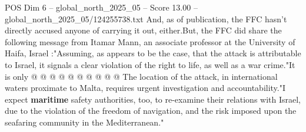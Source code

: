 \begin{textsample}{POS Dim 6 – global\_north\_2025\_05 – Score 13.00 – global\_north\_2025\_05/124255738.txt}
And, as of publication, the FFC hasn't directly accused anyone of carrying it out, either.But, the FFC did share the following message from Itamar Mann, an associate professor at the University of Haifa, Israel :"Assuming, as appears to be the case, that the attack is attributable to Israel, it signals a clear violation of the right to life, as well as a war crime."It is only @ @ @ @ @ @ @ @ @ @ The location of the attack, in international waters proximate to Malta, requires urgent investigation and accountability."I expect \textbf{maritime} safety authorities, too, to re-examine their relations with Israel, due to the violation of the freedom of navigation, and the risk imposed upon the seafaring community in the Mediterranean."

\end{textsample}
